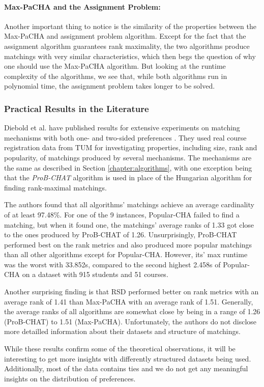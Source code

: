 \paragraph{Max-PaCHA and the Assignment Problem:}
Another important thing to notice is the similarity of the properties between the Max-PaCHA and assignment problem algorithm. Except for the fact that the assignment algorithm guarantees rank maximality, the two algorithms produce matchings with very similar characteristics, which then begs the question of why one should use the Max-PaCHA algorithm. But looking at the runtime complexity of the algorithms, we see that, while both algorithms run in polynomial time, the assignment problem takes longer to be solved.

\subsubsection{Practical Results in the Literature}\label{sec:practical-results-lit}
Diebold et al. have published results for extensive experiments on matching mechanisms with both one- and two-sided preferences \cite{DieboldBenchmark}. They used real course registration data from TUM for investigating properties, including size, rank and popularity, of matchings produced by several mechanisms. The mechanisms are the same as described in Section \ref{chapter:algorithms}, with one exception being that the \emph{ProB-CHAT} algorithm \cite{DieboldBenchmark} is used in place of the Hungarian algorithm for finding rank-maximal matchings.

The authors found that all algorithms' matchings achieve an average cardinality of at least 97.48\%. For one of the 9 instances, Popular-CHA failed to find a matching, but when it found one, the matchings' average ranks of 1.33 got close to the ones produced by ProB-CHAT of 1.26. Unsurprisingly, ProB-CHAT performed best on the rank metrics and also produced more popular matchings than all other algorithms except for Popular-CHA. However, its' max runtime was the worst with 33.852s, compared to the second highest 2.458s of Popular-CHA on a dataset with 915 students and 51 courses.

Another surprising finding is that RSD performed better on rank metrics with an average rank of 1.41 than Max-PaCHA with an average rank of 1.51. Generally, the average ranks of all algorithms are somewhat close by being in a range of 1.26 (ProB-CHAT) to 1.51 (Max-PaCHA). Unfortunately, the authors do not disclose more detailled information about their datasets and structure of matchings. 

While these results confirm some of the theoretical observations, it will be interesting to get more insights with differently structured datasets being used. Additionally, most of the data contains ties and we do not get any meaningful insights on the distribution of preferences. 
